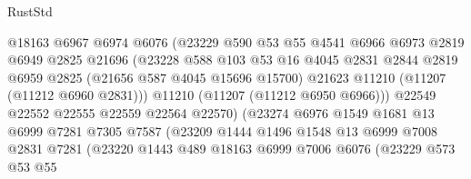 \begin{lexlean}{RustStd}
\begin{coremodule}
                              @18163
                              @6967
                              @6974
                              @6076
                              (@23229
                                @590
                                @53
                                @55
                                @4541
                                @6966
                                @6973
                                @2819
                                @6949
                                @2825
                                @21696
                                (@23228
                                  @588
                                  @103
                                  @53
                                  @16
                                  @4045
                                  @2831
                                  @2844
                                  @2819
                                  @6959
                                  @2825
                                  (@21656 @587 @4045 @15696 @15700)
                                  @21623
                                  @11210
                                  (@11207 (@11212 @6960 @2831)))
                                @11210
                                (@11207 (@11212 @6950 @6966)))
                              @22549
                              @22552
                              @22555
                              @22559
                              @22564
                              @22570)
                            (@23274
                              @6976
                              @1549
                              @1681
                              @13
                              @6999
                              @7281
                              @7305
                              @7587
                              (@23209
                                @1444
                                @1496
                                @1548
                                @13
                                @6999
                                @7008
                                @2831
                                @7281
                                (@23220
                                  @1443
                                  @489
                                  @18163
                                  @6999
                                  @7006
                                  @6076
                                  (@23229
                                    @573
                                    @53
                                    @55

\end{coremodule}
\end{lexlean}
